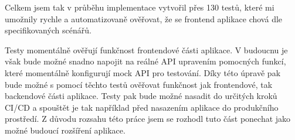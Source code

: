 Celkem jsem tak v průběhu implementace vytvořil přes 130 testů, které mi umožnily rychle a automatizovaně ověřovat, že se frontend aplikace chová dle specifikovaných scénářů.

Testy momentálně ověřují funkčnost frontendové části aplikace. V budoucnu je však bude možné snadno napojit na reálné API upravením pomocných funkcí, které momentálně konfigurují mock API pro testování. Díky této úpravě pak bude možné s pomocí těchto testů ověřovat funkčnost jak frontendové, tak backendové části aplikace. Testy pak bude možné nasadit do určitých kroků CI/CD a spouštět je tak například před nasazením aplikace do produkčního prostředí. Z důvodu rozsahu této práce jsem se rozhodl tuto část ponechat jako možné budoucí rozšíření aplikace.
